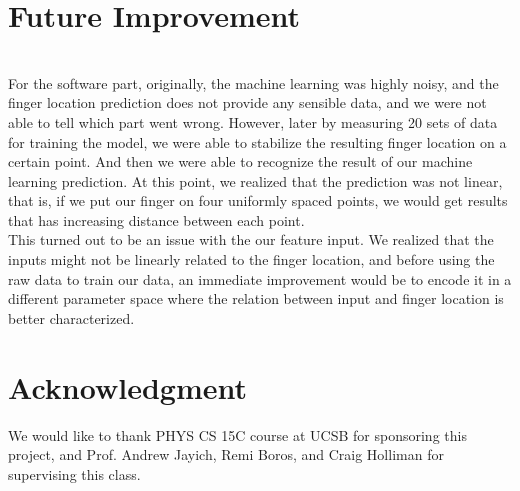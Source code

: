 \documentclass[reprint,amsmath, amsfonts, amssymb, aps, letterpaper]{revtex4-1}
\begin{document}
\section{Future Improvement}
\\\indent For the software part, originally, the machine learning was highly noisy, and the finger location prediction does not provide any sensible data, and we were not able to tell which part went wrong. However, later by measuring 20 sets of data for training the model, we were able to stabilize the resulting finger location on a certain point. And then we were able to recognize the result of our machine learning prediction. At this point, we realized that the prediction was not linear, that is, if we put our finger on four uniformly spaced points, we would get results that has increasing distance between each point. 
\\\indent This turned out to be an issue with the our feature input. We realized that the inputs might not be linearly related to the finger location, and before using the raw data to train our data, an immediate improvement would be to encode it in a different parameter space where the relation between input and finger location is better characterized.

\section{Acknowledgment}
We would like to thank PHYS CS 15C course at UCSB for sponsoring this project, and Prof. Andrew Jayich, Remi Boros, and Craig Holliman for supervising this class.

\nocite{*}
\end{document}
